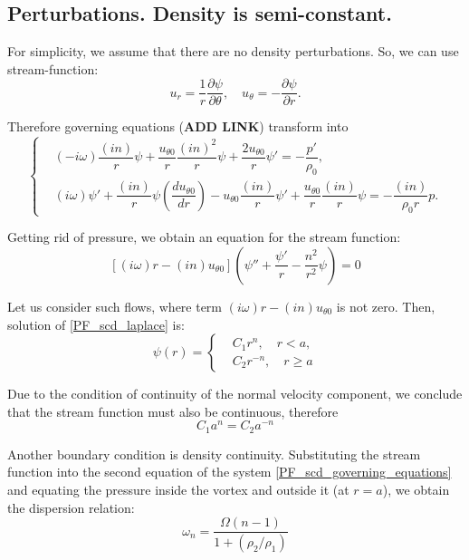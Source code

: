 \subsection{Perturbations. Density is semi-constant.}

For simplicity, we assume that there are no density perturbations. So, we can use stream-function:
\begin{equation}
	u_r = \dfrac{1}{r}\dfrac{\partial \psi}{\partial \theta}, \quad u_{\theta} = - \dfrac{\partial \psi}{\partial r}.
\end{equation}

Therefore governing equations (\textbf{ADD LINK}) transform into
\begin{equation}
	\label{PF_scd_governing_equations}
	\left\{
	\begin{aligned}
		& (-i\omega)\dfrac{(in)}{r} \psi + \dfrac{u_{\theta 0}}{r} \dfrac{(in)^2}{r} \psi + \dfrac{2 u_{\theta 0}}{r} \psi' = - \dfrac{p'}{\rho_0}, \\
		& (i\omega) \psi' + \dfrac{(in)}{r} \psi \left(\dfrac{du_{\theta 0}}{dr}\right) - u_{\theta 0}\dfrac{(in)}{r}\psi' + \dfrac{u_{\theta 0}}{r} \dfrac{(in)}{r} \psi = - \dfrac{(in)}{\rho_0 r} p.
	\end{aligned}
	\right.
\end{equation}

Getting rid of pressure, we obtain an equation for the stream function:
\begin{equation}
	\label{PF_scd_laplace}
	[(i\omega)r - (in)u_{\theta 0}]\left(\psi'' + \dfrac{\psi'}{r} - \dfrac{n^2}{r^2}\psi \right) = 0
\end{equation}

Let us consider such flows, where term $(i\omega)r - (in)u_{\theta 0}$ is not zero. Then, solution of \eqref{PF_scd_laplace} is:
\begin{equation}
	\psi(r) = \left\{
	\begin{aligned}
		& C_1 r^n,\quad r < a, \\
		& C_2 r^{-n}, \quad r \ge a
	\end{aligned}
	\right.
\end{equation}

Due to the condition of continuity of the normal velocity component, we conclude that the stream function must also be continuous, therefore
\begin{equation}
	\label{PF_scd_bc_vel}
	C_1 a^n = C_2 a^{-n}
\end{equation}

Another boundary condition is density continuity. Substituting the stream function into the second equation of the system \eqref{PF_scd_governing_equations} and equating the pressure inside the vortex and outside it (at $r = a$), we obtain the dispersion relation:
\begin{equation}
	\omega_n = \dfrac{\Omega (n-1)}{1 + (\rho_2/\rho_1)}
\end{equation}

